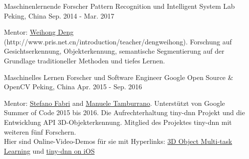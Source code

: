 


\begin{cventries}


\cventry
{Maschinenlernende Forscher} %
{Pattern Recognition und Intelligent System Lab} %
{Peking, China} %
{Sep. 2014 - Mar. 2017} %
{ %
\begin{cvitems}
\item {Mentor: \href{http://www.pris.net.cn/introduction/teacher/dengweihong}{Weihong Deng} (http://www.pris.net.cn/introduction/teacher/dengweihong). Forschung auf Gesichtserkennung, Objekterkennung, semantische Segmentierung auf der Grundlage traditioneller Methoden und tiefes Lernen.}
\end{cvitems}
}

\cventry
{Maschinelles Lernen Forscher und Software Engineer} %
{Google Open Source \& OpenCV} %
{Peking, China} %
{Apr. 2015 - Sep. 2016} %
{ %
\begin{cvitems}
\item {Mentor: \href{https://www.linkedin.com/in/stefano-fabri-16a73748}{Stefano Fabri} and \href{https://www.linkedin.com/in/manuele-tamburrano-b82384a5?authType=name&authToken=Di5p&trk=prof-sb-browse_map-name}{Manuele Tamburrano}. Unterstützt von Google Summer of Code 2015 bis 2016. Die Aufrechterhaltung tiny-dnn Projekt und die Entwicklung API 3D-Objekterkennung. Mitglied des Projektes tiny-dnn mit weiteren fünf Forschern. \\
Hier sind Online-Video-Demos für sie mit Hyperlinks: \href{https://www.youtube.com/watch?v=Mc20rTYdXTE}{3D Object Multi-task Learning} und \href{https://drive.google.com/open?id=0B-RYa1FDOrYXVUEzcG1mdnl5a3M}{tiny-dnn on iOS}
}
\end{cvitems}
}


\end{cventries}
